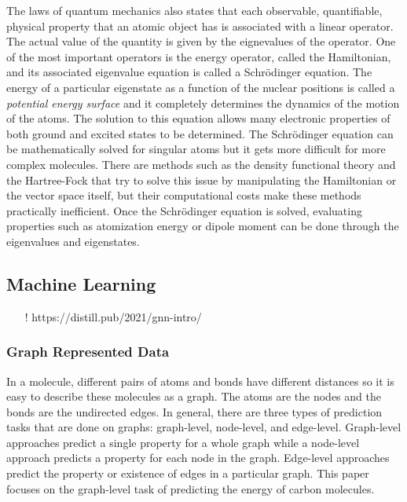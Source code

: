 \documentclass[12pt]{scrartcl}
\begin{document}
The laws of quantum mechanics also states that each observable, quantifiable, physical property that 
an atomic object has is associated with a linear operator. The actual value of the quantity is given 
by the eignevalues of the operator. One of the most important operators is the energy operator, called 
the Hamiltonian, and its associated eigenvalue equation is called a Schrödinger equation. The energy of 
a particular eigenstate as a function of the nuclear positions is called a \emph{potential energy surface}
and it completely determines the dynamics of the motion of the atoms. The solution to this equation 
allows many electronic properties of both ground and excited states to be determined. The Schrödinger 
equation can be mathematically solved for singular atoms but it gets more difficult for more complex molecules. 
There are methods such as the density functional theory and the Hartree-Fock that try to 
solve this issue by manipulating the Hamiltonian or the vector space itself, but their computational 
costs make these methods practically inefficient. Once the Schrödinger equation is solved, evaluating 
properties such as atomization energy or dipole moment can be done through the eigenvalues and eigenstates.


\newpage


\subsection{Machine Learning}
\begin{itemize}
    \item[!] https://distill.pub/2021/gnn-intro/
\end{itemize}
\subsubsection{Graph Represented Data}
In a molecule, different pairs of atoms and bonds have different distances so it is easy to describe
these molecules as a graph. The atoms are the nodes and the bonds are the undirected edges. In general, 
there are three types of prediction tasks that are done on graphs: graph-level, node-level, and edge-level. 
Graph-level approaches predict a single property for a whole graph while a node-level approach predicts 
a property for each node in the graph. Edge-level approaches predict the property or existence of edges 
in a particular graph. This paper focuses on the graph-level task of predicting the energy of carbon 
molecules. 
\end{document}
